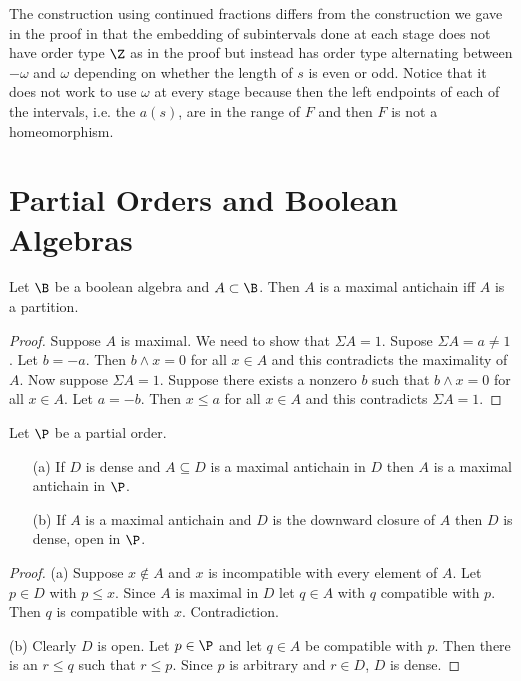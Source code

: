 \documentclass[oneside,12pt]{amsart}
\begin{document}
The construction using continued fractions differs from the construction we gave in the proof
in that the embedding of subintervals done at each stage does not have order type $\Z$ as in the proof but instead
has order type alternating between $-\omega$ and $\omega$ depending on whether the length of $s$ is even or odd.
Notice that it does not work to use $\omega$ at every stage because then the left
endpoints of each of the intervals, i.e. the $a(s)$, are in the range
of $F$ and then $F$ is not a homeomorphism.

\section{Partial Orders and Boolean Algebras}

\begin{lemma}
Let $\B$ be a boolean algebra and $A\subset\B$. Then $A$ is a maximal antichain iff $A$ is a partition.
\end{lemma}
\begin{proof}
Suppose $A$ is maximal. We need to show that $\Sigma A = 1$. Supose $\Sigma A = a \not= 1$. Let
$b = -a$. Then $b \wedge x = 0$ for all $x\in A$ and this contradicts the maximality of $A$. Now suppose
$\Sigma A = 1$. Suppose there exists a nonzero $b$ such that $b \wedge x = 0$ for all $x\in A$. Let
$a = -b$. Then $x\leq a$ for all $x \in A$ and this contradicts $\Sigma A = 1$.
\end{proof}

\begin{lemma}
Let $\P$ be a partial order.
\begin{itemize}
\item[(a)] If $D$ is dense and $A\subseteq D$ is a maximal antichain
in $D$ then $A$ is a maximal antichain in $\P$.
\item[(b)] If $A$ is a maximal antichain and $D$ is the downward closure
of $A$ then $D$ is dense, open in $\P$.
\end{itemize}
\end{lemma}
\begin{proof}
(a) Suppose $x\notin A$ and $x$ is incompatible with every element of $A$.
Let $p\in D$ with $p\leq x$. Since $A$ is maximal in $D$ let $q\in A$ with
$q$ compatible with $p$. Then $q$ is compatible with $x$. Contradiction.

(b) Clearly $D$ is open. Let $p \in \P$ and let $q\in A$ be compatible with $p$.
Then there is an $r\leq q$ such that $r\leq p$. Since $p$ is arbitrary and $r\in D$,
$D$ is dense.
\end{proof}
\end{document}
